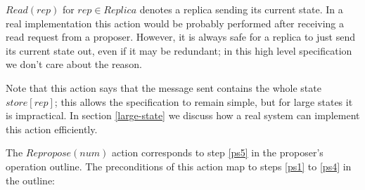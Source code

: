 \documentclass[12pt,a4paper,en]{pracamgr}
\begin{document}
$Read(rep)$ for $rep \in Replica$ denotes a replica sending its current state. In a real implementation this action would be probably performed after receiving a read request from a proposer. However, it is always safe for a replica to just send its current state out, even if it may be redundant; in this high level specification we don't care about the reason.

Note that this action says that the message sent contains the whole state $store[rep]$; this allows the specification to remain simple, but for large states it is impractical. In section \ref{large-state} we discuss how a real system can implement this action efficiently.

The $Repropose(num)$ action corresponds to step \ref{ps5} in the proposer's operation outline. The preconditions of this action map to steps \ref{ps1} to \ref{ps4} in the outline:
\end{document}

